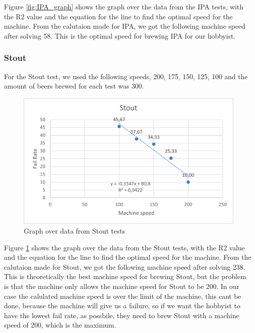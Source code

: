 Figure \ref{fig:IPA_graph} shows the graph over the data from the IPA tests, with the R2 value and the equation for the line to find the optimal speed for the machine. \newline
From the calutaion made for IPA, we got the following machine speed after solving 58. This is the optimal speed for brewing IPA for our hobbyist. \newline

\subsubsection{Stout}
For the Stout test, we used the following speeds, 200, 175, 150, 125, 100 and the amount of beers brewed for each test was 300.

\begin{center}
    \centering
    \begin{figure}[H]
        \includegraphics[width=1\textwidth]{img/Stout_graph.png}
        \caption{Graph over data from Stout tests}
        \label{fig:Stout_graph}
    \end{figure}
\end{center}

Figure \ref{fig:Stout_graph} shows the graph over the data from the Stout tests, with the R2 value and the equation for the line to find the optimal speed for the machine. \newline
From the calutaion made for Stout, we got the following machine speed after solving 238. This is theoretically the best machine speed for brewing Stout, but the problem is that the machine only allows the machine speed for Stout to be 200.
In our case the calulated machine speed is over the limit of the machine, this cant be done, because the machine will give us a failure, so if we want the hobbyist to have the lowest fail rate, as possbile, they need to brew Stout with a machine speed of 200, which is the maximum. \newline

